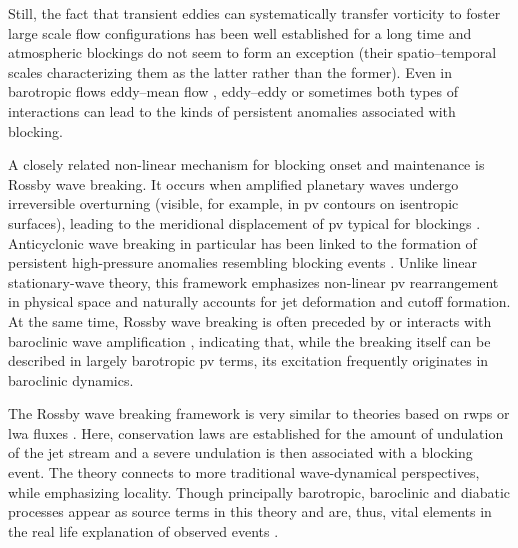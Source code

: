 Still, the fact that transient eddies can systematically transfer vorticity to
foster large scale flow configurations has been well established for a long
time \parencite[e.g.,~][]{kuoVorticityTransferRelated1951} and atmospheric
blockings do not seem to form an exception (their spatio--temporal scales
characterizing them as the latter rather than the former). Even in barotropic
flows eddy--mean flow \parencite{shuttsPropagationEddiesDiffluent1983,
    legrasPersistentAnomaliesBlocking1985}, eddy--eddy
\parencite{yamazakiVortexVortexInteractions2013,
    luoNonlinearMultiscaleInteraction2014, suittersTransientAnticyclonicEddies2023}
or sometimes both types of interactions
\parencite{cashDynamicalProcessesBlock2000} can lead to the kinds of persistent
anomalies associated with blocking.

A closely related non-linear mechanism for blocking onset and maintenance is
Rossby wave breaking. It occurs when amplified planetary waves undergo
irreversible overturning (visible, for example, in \gls{pv} contours on
isentropic surfaces), leading to the meridional displacement of \gls{pv}
typical for blockings \parencite{mcintyreBreakingPlanetaryWaves1983,
    thorncroftTwoParadigmsBaroclinicwave1993}. Anticyclonic wave breaking in
particular has been linked to the formation of persistent high-pressure
anomalies resembling blocking events
\parencite{pellyNewPerspectiveBlocking2003,
    masatoWavebreakingCharacteristicsMidlatitude2012}. Unlike linear
stationary-wave theory, this framework emphasizes non-linear \gls{pv}
rearrangement in physical space and naturally accounts for jet deformation and
cutoff formation. At the same time, Rossby wave breaking is often preceded by
or interacts with baroclinic wave amplification
\parencite{tamarin-brodskyRelationRossbyWavebreaking2024}, indicating that,
while the breaking itself can be described in largely barotropic \gls{pv}
terms, its excitation frequently originates in baroclinic dynamics.

The Rossby wave breaking framework is very similar to theories based on
\glspl{rwp}  \parencite{wirthRossbyWavePackets2018} or \gls{lwa} fluxes
\parencite{huangLocalFiniteamplitudeWave2016,
    nakamuraAtmosphericBlockingTraffic2018}. Here, conservation laws are
established for the amount of undulation of the jet stream and a severe
undulation is then associated with a blocking event. The theory connects
to more traditional wave-dynamical perspectives, while emphasizing locality.
Though principally barotropic, baroclinic and diabatic processes appear as
source terms in this theory and are, thus, vital elements in the real life
explanation of observed events \parencite{neal2021PacificNorthwest2022}.

